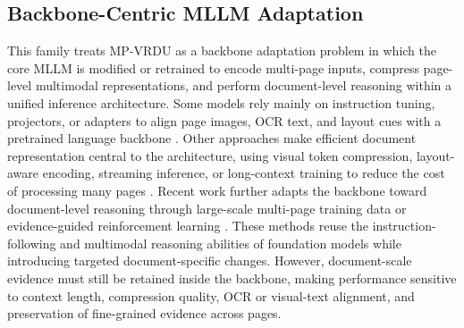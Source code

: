 \documentclass[11pt]{article}
\begin{document}

\subsection{Backbone-Centric MLLM Adaptation}
This family treats MP-VRDU as a backbone adaptation problem in which the core MLLM is modified or retrained to encode multi-page inputs, compress page-level multimodal representations, and perform document-level reasoning within a unified inference architecture. Some models rely mainly on instruction tuning, projectors, or adapters to align page images, OCR text, and layout cues with a pretrained language backbone \cite{jia2024leopard,tanaka2024instructdoc}. Other approaches make efficient document representation central to the architecture, using visual token compression, layout-aware encoding, streaming inference, or long-context training to reduce the cost of processing many pages \cite{hu2025mplug,hannan2025docslm,yu2024texthawk2}. Recent work further adapts the backbone toward document-level reasoning through large-scale multi-page training data or evidence-guided reinforcement learning \cite{duan2025docopilot,xiong2026docr1}. These methods reuse the instruction-following and multimodal reasoning abilities of foundation models while introducing targeted document-specific changes. However, document-scale evidence must still be retained inside the backbone, making performance sensitive to context length, compression quality, OCR or visual-text alignment, and preservation of fine-grained evidence across pages.
 
\end{document}
